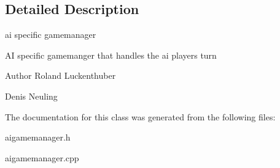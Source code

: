 \subsection{\-Detailed \-Description}
ai specific gamemanager 

\-A\-I specific gamemanger that handles the ai players turn

\begin{DoxyAuthor}{\-Author}
\-Roland \-Luckenthuber 

\-Denis \-Neuling 
\end{DoxyAuthor}


\-The documentation for this class was generated from the following files\-:\begin{DoxyCompactItemize}
\item 
aigamemanager.\-h\item 
aigamemanager.\-cpp\end{DoxyCompactItemize}
